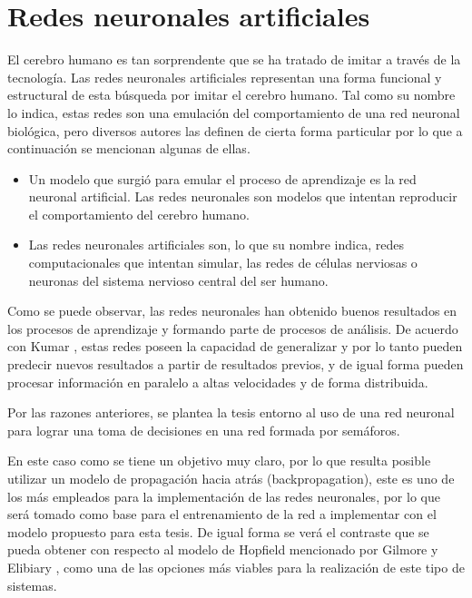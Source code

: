 \section{Redes neuronales artificiales}
		
		
		El cerebro humano es tan sorprendente que se ha tratado de imitar a trav\'{e}s de
	la tecnolog\'{i}a. Las redes neuronales artificiales representan una forma
	funcional y estructural de esta b\'{u}squeda por imitar el cerebro humano. Tal como
	su nombre lo indica, estas redes son una emulaci\'{o}n del comportamiento de una red neuronal biol\'{o}gica, pero diversos autores las definen de cierta forma particular por lo que a continuaci\'{o}n se mencionan algunas de ellas.
	
	\begin{itemize}
	  \item Un modelo que surgi\'{o} para emular el proceso de aprendizaje es la red
	  neuronal artificial. Las redes neuronales son modelos que intentan reproducir
	  el comportamiento del cerebro humano. \cite{Hilera1995}
	  \item Las redes neuronales artificiales son, lo que su nombre indica,
	  redes computacionales que intentan simular, las redes de c\'{e}lulas nerviosas o
	  neuronas del sistema nervioso central del ser humano. \cite{Graupe2007}
	\end{itemize}
	
		Como se puede observar, las redes neuronales han obtenido buenos resultados en
	los procesos de aprendizaje y formando parte de procesos de an\'{a}lisis. De
	acuerdo con Kumar \cite{Kumar2007}, estas redes poseen la capacidad de
	generalizar y por lo tanto pueden predecir nuevos resultados a partir de resultados previos, y de igual forma pueden procesar informaci\'{o}n en paralelo a altas velocidades y de forma distribuida.
	
		Por las razones anteriores, se plantea la tesis entorno al uso de una red
	neuronal para lograr una toma de decisiones en una red formada por sem\'{a}foros.
	
		En este caso como se tiene un objetivo muy claro, por lo que resulta posible
	utilizar un modelo de propagaci\'{o}n hacia atr\'{a}s (backpropagation), este es uno
	de los m\'{a}s empleados para la implementaci\'{o}n de las redes neuronales, por lo
	que ser\'{a} tomado como base para el entrenamiento de la red a implementar con
	el modelo propuesto para esta tesis. De igual forma se ver\'{a} el contraste
	que se pueda obtener con respecto al modelo de Hopfield mencionado por Gilmore
	y Elibiary \cite{Gilmore1993}, como una de las opciones m\'{a}s viables para la
	realizaci\'{o}n de este tipo de sistemas.

